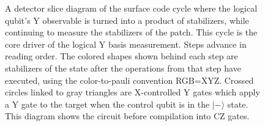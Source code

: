 \documentclass[onecolumn,unpublished,a4paper]{quantumarticle}
\theoremstyle{definition}
\theoremstyle{definition}
\theoremstyle{definition}
\begin{document}
\begin{figure}
    \centering
    \caption{
        A detector slice diagram of the surface code cycle where the logical qubit's Y observable is turned into a product of stabilizers, while continuing to measure the stabilizers of the patch.
        This cycle is the core driver of the logical Y basis measurement.
        Steps advance in reading order.
        The colored shapes shown behind each step are stabilizers of the state after the operations from that step have executed, using the color-to-pauli convention RGB=XYZ.
        Crossed circles linked to gray triangles are X-controlled Y gates which apply a Y gate to the target when the control qubit is in the $|-\rangle$ state.
        This diagram shows the circuit before compilation into CZ gates.
    }
    \label{fig:transition_detector_slices}
\end{figure}
\end{document}
